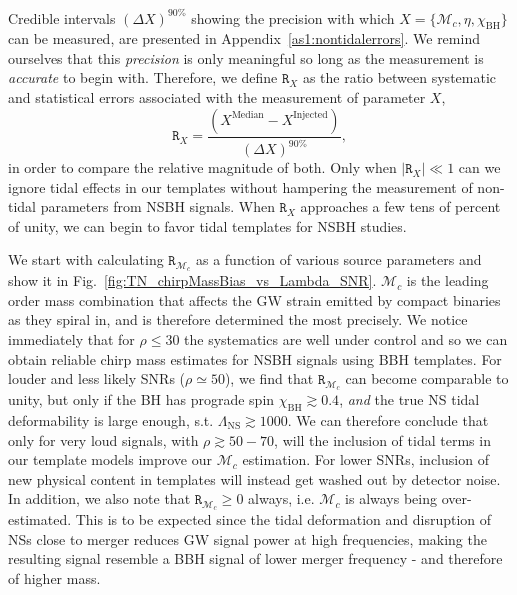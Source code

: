 \documentclass[aps,prd,amsmath,floats,floatfix, twocolumn,
superscriptaddress,nofootinbib,showpacs]{revtex4-1}
\newcommand{\lambdans}{\Lambda_\mathrm{NS}}
\newcommand{\chibh}{\chi_\mathrm{BH}}
\newcommand{\mchirp}{\mathcal{M}_c}
\newcommand{\arr}{\mathtt{R}}
\begin{document}
Credible intervals $(\Delta X)^{90\%}$ showing the precision with which
$X=\{\mchirp,\eta,\chibh\}$ can be measured, are presented in
Appendix~\ref{as1:nontidalerrors}.
We remind ourselves that this {\it precision} is only meaningful so long as the
measurement is {\it accurate} to begin with. Therefore, we define $\arr_X$ as
the ratio between systematic and statistical errors associated with the
measurement of parameter $X$,
\begin{equation}\label{eq:arr}
\arr_X = \dfrac{(X^\mathrm{Median} - X^\mathrm{Injected})}{(\Delta X)^{90\%}},
\end{equation}
in order to compare the relative magnitude of both. Only when
$|\arr_X| \ll 1$ can we ignore tidal effects in our templates
without hampering the measurement of non-tidal parameters from NSBH signals.
When $\arr_X$ approaches a few tens of percent of unity, we can begin to favor
tidal templates for NSBH studies.


We start with calculating $\arr_{\mchirp}$ as a function of various source
parameters and show it in Fig.~\ref{fig:TN_chirpMassBias_vs_Lambda_SNR}.
$\mchirp$ is the leading order
mass combination that affects the GW strain emitted by compact binaries as they
spiral in, and is therefore determined the most precisely. We notice
immediately that for $\rho\leq 30$ the systematics are well under control
and so we can obtain reliable chirp mass estimates for NSBH signals using BBH
templates.
% 
For louder and less likely SNRs ($\rho\simeq 50$), we find that
$\arr_{\mchirp}$ can become comparable to unity, but only if the BH has
prograde spin $\chibh\gtrsim 0.4$, {\it and} the true NS tidal deformability
is large enough, s.t. $\lambdans \gtrsim 1000$.
% 
We can therefore conclude that only for very loud signals, with
$\rho\gtrsim 50-70$, will the inclusion of tidal terms in our template
models improve our $\mchirp$ estimation. For lower SNRs, inclusion of new
physical content in templates will instead get washed out by detector noise.
% 
In addition, we also note that $\arr_{\mchirp}\geq 0$ always,
i.e. $\mchirp$ is always being over-estimated. This is to be expected since
the tidal deformation and disruption of NSs close to merger reduces GW signal
power at high frequencies, making the resulting signal resemble a BBH signal of
lower merger frequency - and therefore of higher mass.
\end{document}
